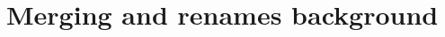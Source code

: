 \documentclass[compress,t]{beamer}
\begin{document}
\begin{comment}
  Tree walking from merge-recursive.c:
  \only<2->{
  \begin{itemize}
    \item unpack\_trees()
    \only<3->{
    \item diff to find renames from base->side1
    \only<4->{
    \item diff to find renames from base->side2
    \only<5->{
    \item get all file and directory names on side1
    \only<6->{
    \item get all file and directory names on side2
    \only<7->{
    \item 6x get stage data \only<8->{for EACH rename \only<9->{on EACH side}}
    }}}}}
  \end{itemize}
  }
  \only<10->{Total: $5+6*number\_of\_renames$}

  \only<11->{
  \vspace*{1.5\baselineskip}
  Tree walking from merge machinery rewrite:
  \only<12->{
  \begin{itemize}
    \item collect\_merge\_info()
    \only<13->{
    \item unpack\_trees()
    }
  \end{itemize}
  }
  \only<14->{Total: $2$}
  }

\end{frame}


\subsection*{But...}
\begin{frame}
  \frametitle{The big kicker...}

  \vfill
  \begin{center}
  \begin{minipage}{0.55\textwidth}
    All of these optimizations combined are often a drop in a bucket
    compared to the cost of rename detection.
  \end{minipage}
  \end{center}

\end{frame}
\end{comment}

\section[Background]{Merging and renames background}
\end{document}
